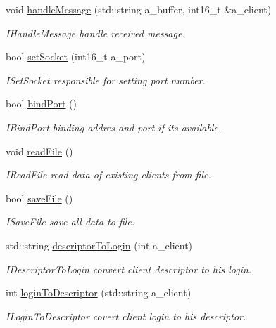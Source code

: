 \begin{DoxyCompactItemize}
void \hyperlink{classServer_a69162b266362feca45186e7b7ba324d8}{handle\+Message} (std\+::string a\+\_\+buffer, int16\+\_\+t \&a\+\_\+client)
\begin{DoxyCompactList}\small\item\em I\+Handle\+Message handle received message. \end{DoxyCompactList}\item 
bool \hyperlink{classServer_aba3fbe9eacc09c66dbf27a7a51cd4428}{set\+Socket} (int16\+\_\+t a\+\_\+port)
\begin{DoxyCompactList}\small\item\em I\+Set\+Socket responsible for setting port number. \end{DoxyCompactList}\item 
bool \hyperlink{classServer_a77c1c337fa5560fbb7da00db0e37535c}{bind\+Port} ()
\begin{DoxyCompactList}\small\item\em I\+Bind\+Port binding addres and port if it\textquotesingle{}s available. \end{DoxyCompactList}\item 
void \hyperlink{classServer_a400b5472132b98a93a3927c61b2fc3a5}{read\+File} ()
\begin{DoxyCompactList}\small\item\em I\+Read\+File read data of existing clients from file. \end{DoxyCompactList}\item 
bool \hyperlink{classServer_a74f4d214e9e7ac4585f64ca3edd9f6cb}{save\+File} ()
\begin{DoxyCompactList}\small\item\em I\+Save\+File save all data to file. \end{DoxyCompactList}\item 
std\+::string \hyperlink{classServer_a89ae87897e4230129c4e72f3cfe7d59a}{descriptor\+To\+Login} (int a\+\_\+client)
\begin{DoxyCompactList}\small\item\em I\+Descriptor\+To\+Login convert client descriptor to his login. \end{DoxyCompactList}\item 
int \hyperlink{classServer_ab1c90c5a69cf69f05876d82dc4cd59ea}{login\+To\+Descriptor} (std\+::string a\+\_\+client)
\begin{DoxyCompactList}\small\item\em I\+Login\+To\+Descriptor covert client login to his descriptor. \end{DoxyCompactList}\item 

\end{DoxyCompactItemize}
